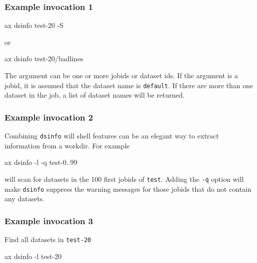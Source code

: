 \subsubsection*{Example invocation 1}
\begin{shell}
ax dsinfo test-20 -S
\end{shell}
or
\begin{shell}
ax dsinfo test-20/badlines
\end{shell}

The argument can be one or more jobids or dataset ids.  If the
argument is a jobid, it is assumed that the dataset name is
\texttt{default}.  If there are more than one dataset in the job, a
list of dataset names will be returned.

\subsubsection*{Example invocation 2}
Combining \texttt{dsinfo} will shell features can be an elegant way to
extract information from a workdir.  For example
\begin{shell}
ax dsinfo -l -q test-{0..99}
\end{shell}
will scan for datasets in the 100 first jobids of \texttt{test}.
Adding the \texttt{-q} option will make \texttt{dsinfo} suppress the
warning messages for those jobids that do not contain any datasets.

\subsubsection*{Example invocation 3}
Find all datasets in \texttt{test-20}
\begin{shell}
ax dsinfo -l test-20
\end{shell}


